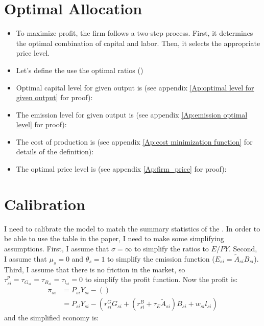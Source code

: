 \documentclass[12pt]{article} %
\begin{document}
\section*{Optimal Allocation}
\begin{itemize}
    \item To maximize profit, the firm follows a two-step process. First, it determines the optimal combination of capital and labor. Then, it selects the appropriate price level.
    

    

    \item Let's define the use the optimal ratios ()
    
    \item Optimal capital level for given output is (see appendix \ref{Ap:optimal level for given output} for proof):
    

    \item The emission level for given output is (see appendix \ref{Ap:emission optimal level} for proof):
    
    
    \item The cost of production is (see appendix \ref{Ap:cost minimization function} for details of the definition):
    
    
    \item The optimal price level is (see appendix \ref{Ap:firm_price} for proof):
    

\end{itemize}

\section*{Calibration}
I need to calibrate the model to match the summary statistics of the \cite{martinsson2024effect}. In order to be able to use the table in the paper, I need to make some simplifying assumptions. First, I assume that $\sigma = \infty$ to simplify the ratios to $E/PY$. Second, I assume that $\mu_s = 0$ and $\theta_s = 1$ to simplify the emission function ($
    E_{si} = \tilde{A}_{si}B_{si}
$). Third, I assume that there is no friction in the market, so $\tau_{si}^p = \tau_{G_{si}} = \tau_{B_{si}} = \tau_{l_{si}} = 0$ to simplify the profit function.
Now the profit is:
    \begin{equation*}
        \begin{split}
            \pi_{si} &=  P_{si} Y_{si} - ()\\
            & = P_{si} Y_{si} - (r_{{si}}^GG_{si}  + (r_{{si}}^B + \tau_E\tilde{A}_{si})B_{si} +  w_{si}l_{si})
        \end{split}
    \end{equation*}
    and the simplified economy is:
\end{document}

